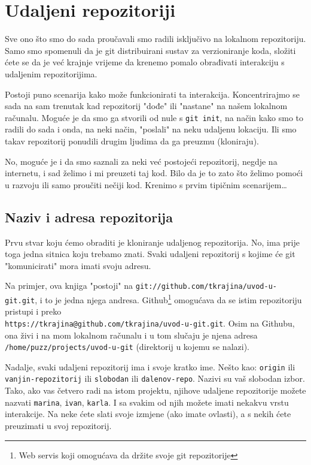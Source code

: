 \chapter*{Udaljeni repozitoriji}

Sve ono što smo do sada proučavali smo radili isključivo na lokalnom repozitoriju.
Samo smo spomenuli da je git distribuirani sustav za verzioniranje koda, složiti ćete se da je već krajnje vrijeme da krenemo pomalo obrađivati interakciju s udaljenim repozitorijima.

Postoji puno scenarija kako može funkcionirati ta interakcija.
Koncentrirajmo se sada na sam trenutak kad repozitorij "dođe" ili "nastane" na našem lokalnom računalu.
Moguće je da smo ga stvorili od nule s \verb+git init+, na način kako smo to radili do sada i onda, na neki način, "poslali" na neku udaljenu lokaciju.
Ili smo takav repozitorij ponudili drugim ljudima da ga preuzmu (kloniraju).

No, moguće je i da smo saznali za neki već postojeći repozitorij, negdje na internetu, i sad želimo i mi preuzeti taj kod.
Bilo da je to zato što želimo pomoći u razvoju ili samo proučiti nečiji kod.
Krenimo s prvim tipičnim scenarijem\dots

\section*{Naziv i adresa repozitorija}

Prvu stvar koju ćemo obraditi je kloniranje udaljenog repozitorija.
No, ima prije toga jedna sitnica koju trebamo znati.
Svaki udaljeni repozitorij s kojime će git "komunicirati" mora imati svoju adresu.

Na primjer, ova knjiga "postoji" na \verb+git://github.com/tkrajina/uvod-u-git.git+, i to je jedna njega andresa.
Github\footnote{Web servis koji omogućava da držite svoje git repozitorije} omogućava da se istim repozitoriju pristupi i preko \\ \verb+https://tkrajina@github.com/tkrajina/uvod-u-git.git+.
Osim na Githubu, ona živi i na mom lokalnom računalu i u tom slučaju je njena adresa \verb+/home/puzz/projects/uvod-u-git+ (direktorij u kojemu se nalazi).

Nadalje, svaki udaljeni repozitorij ima i svoje kratko ime.
Nešto kao: \verb+origin+ ili \\ \verb+vanjin-repozitorij+ ili \verb+slobodan+ ili \verb+dalenov-repo+.
Nazivi su vaš slobodan izbor. 
Tako, ako vas četvero radi na istom projektu, njihove udaljene repozitorije možete nazvati \verb+marina+, \verb+ivan+, \verb+karla+.
I sa svakim od njih možete imati nekakvu vrstu interakcije. 
Na neke ćete slati svoje izmjene (ako imate ovlasti), a s nekih ćete preuzimati u svoj repozitorij.

